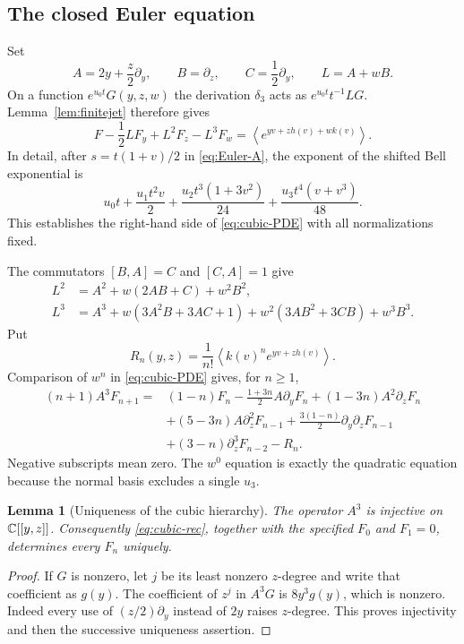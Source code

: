 \documentclass[11pt]{article}
\numberwithin{equation}{section}
\newtheorem{lemma}[theorem]{Lemma}
\theoremstyle{definition}\newtheorem{definition}[theorem]{Definition}
\theoremstyle{remark}\newtheorem{remark}[theorem]{Remark}
\newcommand{\avg}[1]{\left\langle #1\right\rangle}
\begin{document}
\subsection{The closed Euler equation}
Set
\[
 A=2y+\frac z2\partial_y,\qquad B=\partial_z,\qquad
 C=\frac12\partial_y,\qquad L=A+wB.
\]
On a function $e^{u_0t}G(y,z,w)$ the derivation $\delta_3$ acts as
$e^{u_0t}t^{-1}LG$. Lemma~\ref{lem:finitejet} therefore gives
\begin{equation}\label{eq:cubic-PDE}
 F-\frac12L F_y+L^2F_z-L^3F_w
 =\avg{e^{yv+zh(v)+wk(v)}}.
\end{equation}
In detail, after $s=t(1+v)/2$ in \eqref{eq:Euler-A}, the exponent of
the shifted Bell exponential is
\[
 u_0t+\frac{u_1t^2v}{2}
 +\frac{u_2t^3(1+3v^2)}{24}
 +\frac{u_3t^4(v+v^3)}{48}.
\]
This establishes the right-hand side of \eqref{eq:cubic-PDE} with all
normalizations fixed.

The commutators $[B,A]=C$ and $[C,A]=1$ give
\begin{align*}
 L^2&=A^2+w(2AB+C)+w^2B^2,\\
 L^3&=A^3+w(3A^2B+3AC+1)
          +w^2(3AB^2+3CB)+w^3B^3.
\end{align*}
Put
\[
 R_n(y,z)=\frac1{n!}\avg{k(v)^ne^{yv+zh(v)}}.
\]
Comparison of $w^n$ in \eqref{eq:cubic-PDE} gives, for $n\ge1$,
\begin{equation}\label{eq:cubic-rec}
\begin{split}
 (n+1)A^3F_{n+1}={}&(1-n)F_n-\frac{1+3n}{2}A\partial_yF_n
 +(1-3n)A^2\partial_zF_n\\
 &+(5-3n)A\partial_z^2F_{n-1}
 +\frac{3(1-n)}2\partial_y\partial_zF_{n-1}\\
 &+(3-n)\partial_z^3F_{n-2}-R_n.
\end{split}
\end{equation}
Negative subscripts mean zero. The $w^0$ equation is exactly the
quadratic equation because the normal basis excludes a single $u_3$.

\begin{lemma}[Uniqueness of the cubic hierarchy]\label{lem:injective}
The operator $A^3$ is injective on $\mathbb C[[y,z]]$. Consequently
\eqref{eq:cubic-rec}, together with the specified $F_0$ and $F_1=0$,
determines every $F_n$ uniquely.
\end{lemma}
\begin{proof}
If $G$ is nonzero, let $j$ be its least nonzero $z$-degree and write that
coefficient as $g(y)$. The coefficient of $z^j$ in $A^3G$ is
$8y^3g(y)$, which is nonzero. Indeed every use of $(z/2)\partial_y$
instead of $2y$ raises $z$-degree. This proves injectivity and then the
successive uniqueness assertion.
\end{proof}
\end{document}
